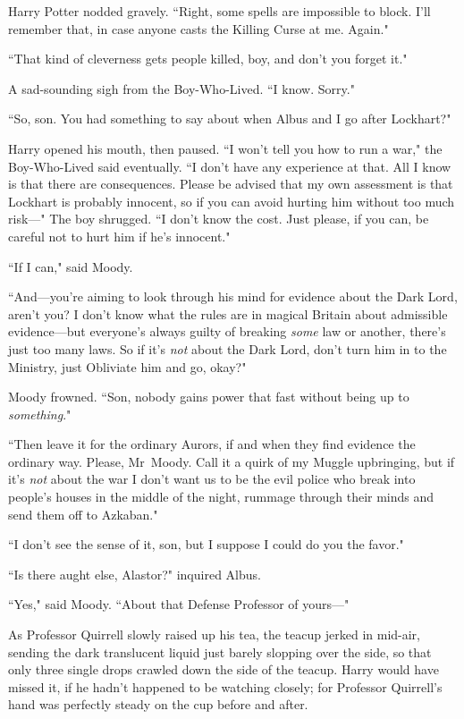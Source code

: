 Harry Potter nodded gravely. ``Right, some spells are impossible to block. I'll remember that, in case anyone casts the Killing Curse at me. Again."

``That kind of cleverness gets people killed, boy, and don't you forget it."

A sad-sounding sigh from the Boy-Who-Lived. ``I know. Sorry."

``So, son. You had something to say about when Albus and I go after Lockhart?"

Harry opened his mouth, then paused. ``I won't tell you how to run a war," the Boy-Who-Lived said eventually. ``I don't have any experience at that. All I know is that there are consequences. Please be advised that my own assessment is that Lockhart is probably innocent, so if you can avoid hurting him without too much risk—" The boy shrugged. ``I don't know the cost. Just please, if you can, be careful not to hurt him if he's innocent."

``If I can," said Moody.

``And—you're aiming to look through his mind for evidence about the Dark Lord, aren't you? I don't know what the rules are in magical Britain about admissible evidence—but everyone's always guilty of breaking \emph{some} law or another, there's just too many laws. So if it's \emph{not} about the Dark Lord, don't turn him in to the Ministry, just Obliviate him and go, okay?"

Moody frowned. ``Son, nobody gains power that fast without being up to \emph{something}."

``Then leave it for the ordinary Aurors, if and when they find evidence the ordinary way. Please, Mr~Moody. Call it a quirk of my Muggle upbringing, but if it's \emph{not} about the war I don't want us to be the evil police who break into people's houses in the middle of the night, rummage through their minds and send them off to Azkaban."

``I don't see the sense of it, son, but I suppose I could do you the favor."

``Is there aught else, Alastor?" inquired Albus.

``Yes," said Moody. ``About that Defense Professor of yours—"



As Professor Quirrell slowly raised up his tea, the teacup jerked in mid-air, sending the dark translucent liquid just barely slopping over the side, so that only three single drops crawled down the side of the teacup. Harry would have missed it, if he hadn't happened to be watching closely; for Professor Quirrell's hand was perfectly steady on the cup before and after.

